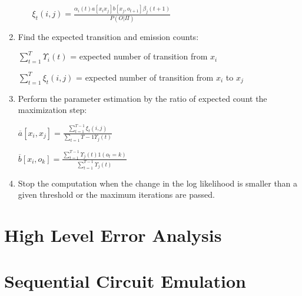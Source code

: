 \begin{enumerate}
\begin{itemize}
$\xi_{t}(i,j) = \frac{\alpha_i (t) a[x_i x_j] b[x_j,o_{t + 1}] \beta_j (t + 1)   }{P(O | \Pi)}$

\end{itemize}
\item Find the expected transition and emission counts:

$\sum\limits_{t = 1}^{ T } \Upsilon_i (t)$ = expected number of transition from $x_i$

$\sum\limits_{t = 1}^{ T} \xi_t (i ,j)$ = expected number of transition from $x_i$ to $x_j$

\item Perform the parameter estimation by the ratio of expected count the maximization step:


$\overline{a}[x_i, x_j] = \frac{\sum\limits_{t = 1}^{T - 1}\xi_{t} (i, j)}{\sum\limits_{t = 1} T - 1 \Upsilon_{j}(t)} $




$\overline{b}[x_i, o_k] = \frac{\sum\limits_{t = 1}^{T - 1}\Upsilon_{j} (t) 1 (o_t = k)}{\sum\limits_{t = 1}^{T - 1} \Upsilon_{j}(t)} $

\item Stop the computation when the change in the log likelihood is smaller than a given threshold or the maximum iterations are passed.

\end{enumerate} 















\section{High Level Error Analysis}








\section{Sequential Circuit Emulation}



